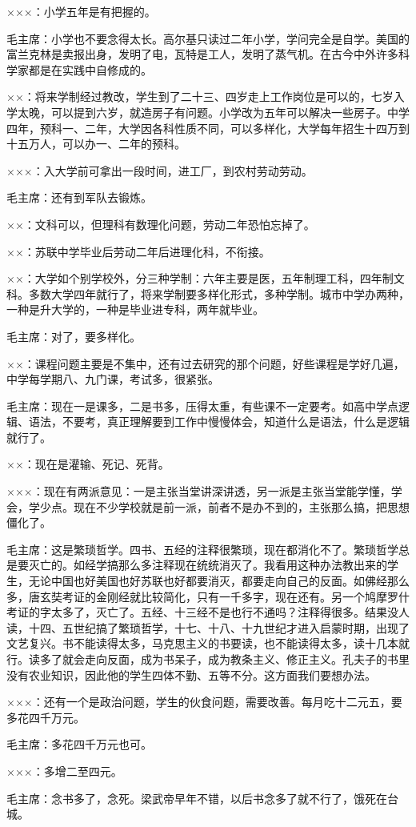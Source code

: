 ×××：小学五年是有把握的。

毛主席：小学也不要念得太长。高尔基只读过二年小学，学问完全是自学。美国的富兰克林是卖报出身，发明了电，瓦特是工人，发明了蒸气机。在古今中外许多科学家都是在实践中自修成的。

××：将来学制经过教改，学生到了二十三、四岁走上工作岗位是可以的，七岁入学太晚，可以提到六岁，就造房子有问题。小学改为五年可以解决一些房子。中学四年，预科一、二年，大学因各科性质不同，可以多样化，大学每年招生十四万到十五万人，可以办一、二年的预科。

×××：入大学前可拿出一段时间，进工厂，到农村劳动劳动。

毛主席：还有到军队去锻炼。

××：文科可以，但理科有数理化问题，劳动二年恐怕忘掉了。

××：苏联中学毕业后劳动二年后进理化科，不衔接。

××：大学如个别学校外，分三种学制：六年主要是医，五年制理工科，四年制文科。多数大学四年就行了，将来学制要多样化形式，多种学制。城市中学办两种，一种是升大学的，一种是毕业进专科，两年就毕业。

毛主席：对了，要多样化。

××：课程问题主要是不集中，还有过去研究的那个问题，好些课程是学好几遍，中学每学期八、九门课，考试多，很紧张。

毛主席：现在一是课多，二是书多，压得太重，有些课不一定要考。如高中学点逻辑、语法，不要考，真正理解要到工作中慢慢体会，知道什么是语法，什么是逻辑就行了。

××：现在是灌输、死记、死背。

×××：现在有两派意见：一是主张当堂讲深讲透，另一派是主张当堂能学懂，学会，学少点。现在不少学校就是前一派，前者不是办不到的，主张那么搞，把思想僵化了。

毛主席：这是繁琐哲学。四书、五经的注释很繁琐，现在都消化不了。繁琐哲学总是要灭亡的。如经学搞那么多注释现在统统消灭了。我看用这种办法教出来的学生，无论中国也好美国也好苏联也好都要消灭，都要走向自己的反面。如佛经那么多，唐玄奘考证的金刚经就比较简化，只有一千多字，现在还有。另一个鸠摩罗什考证的字太多了，灭亡了。五经、十三经不是也行不通吗？注释得很多。结果没人读，十四、五世纪搞了繁琐哲学，十七、十八、十九世纪才进入启蒙时期，出现了文艺复兴。书不能读得太多，马克思主义的书要读，也不能读得太多，读十几本就行。读多了就会走向反面，成为书呆子，成为教条主义、修正主义。孔夫子的书里没有农业知识，因此他的学生四体不勤、五等不分。这方面我们要想办法。

×××：还有一个是政治问题，学生的伙食问题，需要改善。每月吃十二元五，要多花四千万元。

毛主席：多花四千万元也可。

×××：多增二至四元。

毛主席：念书多了，念死。梁武帝早年不错，以后书念多了就不行了，饿死在台城。

